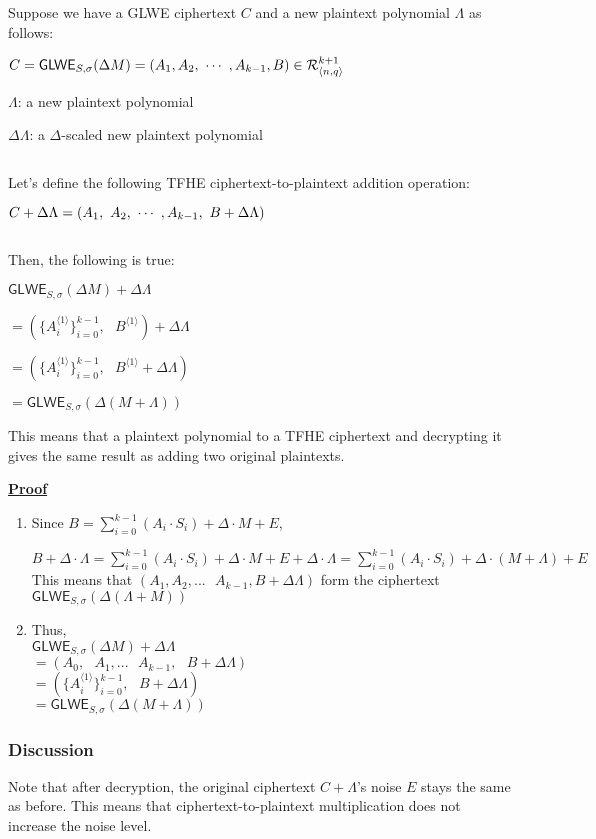Suppose we have a GLWE ciphertext $C$ and a new plaintext polynomial $\Lambda$ as follows: 


$C = \textsf{GLWE}_{S, \sigma}(\Delta M) = ( A_1, A_2, \text{ } \text{$\cdots$} \text{ }, A_{k-1}, B) \in \mathcal{R}_{\langle n,q \rangle}^{k + 1}$

$\Lambda$: a new plaintext polynomial

$\Delta \Lambda$: a $\Delta$-scaled new plaintext polynomial

$ $

\noindent Let's define the following TFHE ciphertext-to-plaintext addition operation: 

$C + \Delta\Lambda = ( A_1, \text{ } A_2, \text{ } \text{$\cdots$} \text{ }, A_{k-1}, \text{ } B + \Delta \Lambda)$

$ $

\noindent Then, the following is true:

\begin{tcolorbox}[title={\textbf{\tboxlabel{\ref*{sec:glwe-add-plain}} GLWE Homomorphic Addition with a Plaintext}}]
$\textsf{GLWE}_{S, \sigma}(\Delta M) + \Delta\Lambda $

$=  (\{A_i^{\langle 1 \rangle}\}_{i=0}^{k-1}, \text{ } B^{\langle 1 \rangle}) + \Delta\Lambda$

$=  (\{A_i^{\langle 1 \rangle}\}_{i=0}^{k-1}, \text{ } B^{\langle 1 \rangle} + \Delta\Lambda)$

$= \textsf{GLWE}_{S, \sigma}(\Delta (M + \Lambda) )$
\end{tcolorbox}


This means that a plaintext polynomial to a TFHE ciphertext and decrypting it gives the same result as adding two original plaintexts. 




\noindent \textbf{\underline{Proof}}
\begin{enumerate}
\item Since $B = \sum\limits_{i=0}^{k-1}{(A_i \cdot S_i)} + \Delta \cdot M + E$,

$B + \Delta \cdot \Lambda = \sum\limits_{i=0}^{k-1}{(A_i \cdot S_i)} + \Delta \cdot M + E + \Delta \cdot \Lambda = \sum\limits_{i=0}^{k-1}{(A_i \cdot S_i)} + \Delta \cdot (M + \Lambda) + E$  \\

This means that $(A_1, A_2, ... \text{ } A_{k-1}
, B + \Delta \Lambda)$ form the ciphertext $\textsf{GLWE}_{S, \sigma}(\Delta (\Lambda + M))$
\item Thus, \\
$\textsf{GLWE}_{S, \sigma}(\Delta M) + \Delta\Lambda$ \\
$ = (A_0, \text { } A_1, ... \text{ } A_{k-1}, \text { } B + \Delta \Lambda)$ \\
$ = (\{A_i^{\langle 1 \rangle}\}_{i=0}^{k-1}, \text { } B + \Delta \Lambda)$ \\
$= \textsf{GLWE}_{S, \sigma}(\Delta (M + \Lambda))$

\begin{flushright}
\qedsymbol{} 
\end{flushright}
\end{enumerate}

\subsubsection{Discussion}

 Note that after decryption, the original ciphertext $C +\Lambda$'s noise $E$ stays the same as before. This means that ciphertext-to-plaintext multiplication does not increase the noise level.